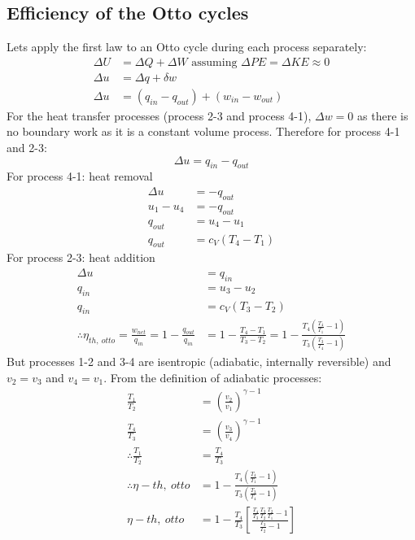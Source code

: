 \documentclass[class=report, crop=false, 12pt,a4paper]{standalone}
\begin{document}
\subsection{Efficiency of the Otto cycles}
Lets apply the first law to an Otto cycle during each process separately:
\begin{align}
  \Delta U &= \Delta Q + \Delta W \textrm{ assuming } \Delta PE = \Delta KE \approx 0\\
  \Delta u &= \Delta q + \delta w\\
  \Delta u &= (q_{in} - q_{out}) + (w_{in} - w_{out})
\end{align}
For the heat transfer processes (process 2-3 and process 4-1), $\Delta w = 0$ as there is no boundary work as it is a constant volume process. Therefore for process 4-1 and 2-3:
\begin{equation}
  \Delta u = q_{in} - q_{out}
\end{equation}
For process 4-1: heat removal
\begin{align}
  \Delta u &= -q_{out}\\
  u_1 - u_4 &= - q_{out}\\
  q_{out} &= u_4 - u_1\\
  q_{out} &= c_V(T_4 - T_1)
\end{align}
For process 2-3: heat addition
\begin{align}
  \Delta u &= q_{in}\\
  q_{in} &= u_3 - u_2\\
  q_{in} &= c_V(T_3 - T_2)\\
  \therefore \eta_{th , \ otto} = \frac{w_{net}}{q_{in}} = 1 - \frac{q_{out}}{q_{in}} &= 1 - \frac{T_4 - T_1}{T_3 - T_2} = 1 - \frac{T_4 \left( \frac{T_4}{T_1} -1 \right)}{T_3 \left( \frac{T_3}{T_4} - 1 \right)}
\end{align}
But processes 1-2 and 3-4 are isentropic (adiabatic, internally reversible) and $v_2 = v_3$ and $v_4 = v_1$. From the definition of adiabatic processes:
\begin{align}
  \frac{T_1}{T_2} &= \left( \frac{v_2}{v_1} \right)^{\gamma -1}\\
  \frac{T_4}{T_3} &= \left( \frac{v_3}{v_4} \right)^{\gamma -1}\\
  \therefore \frac{T_1}{T_2} &= \frac{T_4}{T_3}\\
  \therefore \eta-{th, \ otto} &= 1 - \frac{T_4 \left( \frac{T_4}{T_1} -1 \right)}{T_3 \left( \frac{T_3}{T_4} - 1 \right)}\\
  \eta-{th, \ otto} &= 1 - \frac{T_4}{T_3}\left[ \frac{\frac{T_4}{T_3} \frac{T_3}{T_2} \frac{T_2}{T_1} - 1}{\frac{T_3}{T_2} -1} \right]
\end{align}
\end{document}
